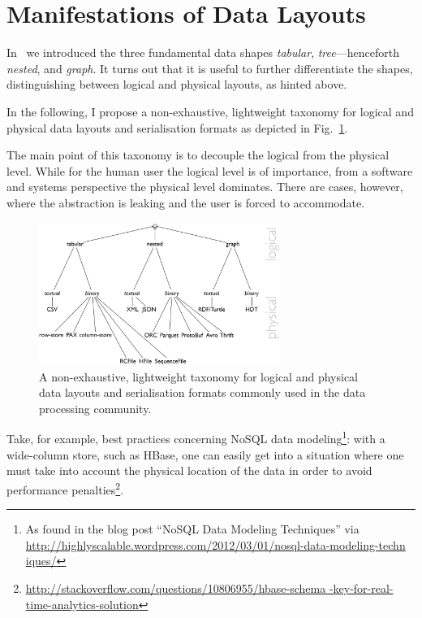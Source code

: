 \documentclass{llncs}
\begin{document}
\section{Manifestations of Data Layouts}
\label{sec:mani}
In~\cite{Hausenblas:arxiv2012} we introduced the three fundamental data shapes
\emph{tabular}, \emph{tree}---henceforth \emph{nested}, and \emph{graph}. It
turns out that it is useful to further differentiate the shapes, distinguishing
between logical and physical layouts, as hinted above.

In the following, I propose a non-exhaustive, lightweight taxonomy
for logical and physical data layouts and serialisation formats as depicted in
Fig.~\ref{fig:taxonomy-dl}.

The main point of this taxonomy is to decouple the logical from the physical 
level. While for the human user the logical level is of importance, from a
software and systems perspective the physical level dominates. There are cases,
however, where the abstraction is leaking and the user is forced to accommodate.
\begin{figure}[ht!]
\centering
\includegraphics[width=0.7\textwidth]{taxonomy-dl}
\caption{A non-exhaustive, lightweight taxonomy for logical and physical data 
layouts and serialisation formats commonly used in the data processing 
community.}
\label{fig:taxonomy-dl}
\end{figure}

Take, for example, best practices concerning NoSQL data modeling\footnote{As 
found in the blog post ``NoSQL Data Modeling Techniques'' via 
\url{http://highlyscalable.wordpress.com/2012/03/01/nosql-data-modeling-techn
iques/}}: with a wide-column store, such as HBase, one can easily get into a
situation where one must take into account the physical location of the data
in order to avoid performance 
penalties\footnote{\tiny \url{http://stackoverflow.com/questions/10806955/hbase-schema
-key-for-real-time-analytics-solution}}.
\end{document}
